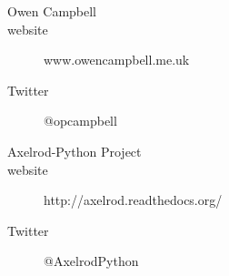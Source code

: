 

\begin{frame}{}

  \begin{description}
    \item [Owen Campbell]
    \item [website] www.owencampbell.me.uk
    \item [Twitter] @opcampbell
  \end{description}
  \vfill
  \begin{description}
    \item [Axelrod-Python Project]
    \item [website] http://axelrod.readthedocs.org/
    \item [Twitter] @AxelrodPython
  \end{description}
  \speakernote{
  }
\end{frame}
